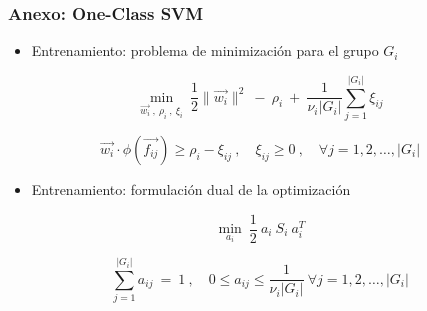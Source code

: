 \begin{frame}
    \frametitle{Anexo: One-Class SVM}

    \begin{itemize}
        \item
        \footnotesize Entrenamiento: problema de minimización para el grupo $G_{i}$
    \end{itemize}

    \begin{equation}
        \min_{
            \vec{w_{i}}
            \ , \
            \rho_{i}
            \ , \
            \xi_{i}
        }
        \
        \frac{1}{2} \lVert {\vec{w_{i}}} \rVert^2
        \ - \
        \rho_{i}
        \ + \
        \frac{1}{\nu_{i} \lvert G_{i} \rvert} \sum_{j=1}^{\lvert G_{i} \rvert} \xi_{ij}
    \end{equation}

    \begin{equation}
        \vec{w_{i}} \cdot \phi(\vec{f_{ij}}) \geqslant \rho_{i} - \xi_{ij}
        \ , \quad
        \xi_{ij} \geqslant 0
        \ , \quad
        \forall j = 1,2, \dots, \lvert G_{i} \rvert
    \end{equation}

    \begin{itemize}
        \item
        \footnotesize Entrenamiento: formulación dual de la optimización
    \end{itemize}

    \begin{equation}
        \min_{a_{i}}
        \
        \frac{1}{2} \ a_{i} \ S_{i} \ a_{i}^{T}
    \end{equation}

    \begin{equation}
        \sum_{j=1}^{\lvert G_{i} \rvert} a_{ij} \ = \ 1
        \ , \quad
        0 \leqslant a_{ij} \leqslant \frac{1}{\nu_{i} \lvert G_{i} \rvert}
        \
        \forall j = 1,2, \dots, \lvert G_{i} \rvert
    \end{equation}
\end{frame}

